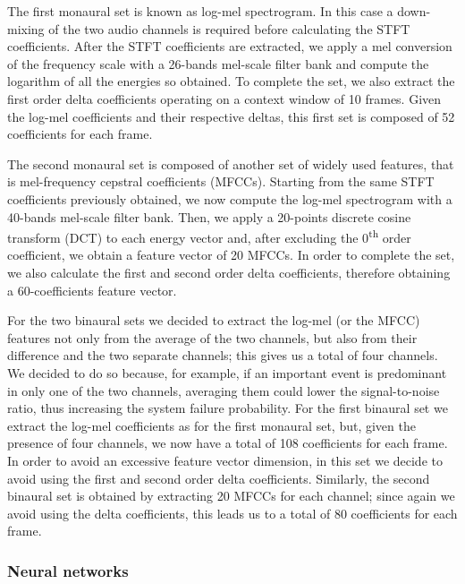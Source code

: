 The first monaural set is known as log-mel spectrogram. In this case a down-mixing of the two audio channels is required before calculating the STFT coefficients. After the STFT coefficients are extracted, we apply a mel conversion of the frequency scale with a 26-bands mel-scale filter bank and compute the logarithm of all the energies so obtained. To complete the set, we also extract the first order delta coefficients operating on a context window of 10 frames. Given the log-mel coefficients and their respective deltas, this first set is composed of 52 coefficients for each frame.

The second monaural set is composed of another set of widely used features, that is mel-frequency cepstral coefficients (MFCCs). Starting from the same STFT coefficients previously obtained, we now compute the log-mel spectrogram with a 40-bands mel-scale filter bank. Then, we apply a 20-points discrete cosine transform (DCT) to each energy vector and, after excluding the 0\textsuperscript{th} order coefficient, we obtain a feature vector of 20 MFCCs. In order to complete the set, we also calculate the first and second order delta coefficients, therefore obtaining a 60-coefficients feature vector.

For the two binaural sets we decided to extract the log-mel (or the MFCC) features not only from the average of the two channels, but also from their difference and the two separate channels; this gives us a total of four channels. We decided to do so because, for example, if an important event is predominant in only one of the two channels, averaging them could lower the signal-to-noise ratio, thus increasing the system failure probability. For the first binaural set we extract the log-mel coefficients as for the first monaural set, but, given the presence of four channels, we now have a total of 108 coefficients for each frame. In order to avoid an excessive feature vector dimension, in this set we decide to avoid using the first and second order delta coefficients. Similarly, the second binaural set is obtained by extracting 20 MFCCs for each channel; since again we avoid using the delta coefficients, this leads us to a total of 80 coefficients for each frame. 

\subsubsection{Neural networks}

